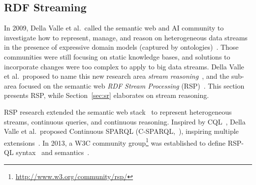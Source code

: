 \subsection{RDF Streaming}\label{sec:rdf} %

In 2009, Della Valle et al.\ called the semantic web and AI community
to investigate how to represent, manage, and reason on heterogeneous
data streams in the presence of expressive domain
models (captured by ontologies)~\cite{DBLP:journals/expert/ValleCHF09}.
Those communities were still focusing on static knowledge bases, and
solutions to incorporate changes were too complex to apply to big data
streams.  Della Valle et al.\ proposed to name this new research area
\emph{stream reasoning}~\cite{DellAglioDataScience2017}, and 
the sub-area focused on the semantic web \emph{RDF
  Stream Processing} (RSP)~\cite{DBLP:conf/debs/ValleDM16}. This
section presents RSP, while Section~\ref{sec:sr} elaborates on stream
reasoning.


\sloppy RSP research extended the
semantic web stack~\cite{DBLP:books/daglib/0036180} to represent
heterogeneous streams, continuous queries, and continuous
reasoning. Inspired by CQL~\cite{arasu_widom_2004}, Della Valle et
al.\ proposed Continuous SPARQL
(\textsf{C-SPARQL},~\cite{DBLP:conf/fis/ValleCBBC08}), inspiring multiple
extensions~\cite{DBLP:journals/semweb/AnicicRFS12,Calbimonte2010,LePhuoc2012c}.
In 2013, a W3C community
group\footnote{\url{http://www.w3.org/community/rsp/}} was established
to define \textsf{RSP-QL} syntax~\cite{DBLP:conf/esws/DellAglioCVC15}
and semantics~\cite{DBLP:journals/ijswis/DellAglioVCC14}.


